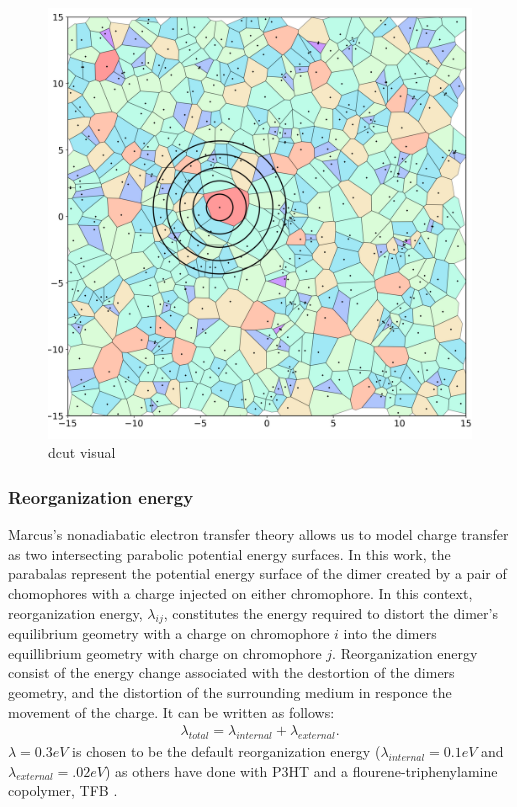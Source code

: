 \begin{figure}
  \center
  \includegraphics[width=0.8\linewidth]{figures/crystalline_voronoi_d_cut_circles.png} 
  \caption{dcut visual}
  \label{fig:dcut}
\end{figure}


\subsubsection{Reorganization energy}
Marcus's nonadiabatic electron transfer theory allows us to model charge transfer as two
intersecting parabolic potential energy surfaces. In this work, the parabalas represent the potential energy surface
of the dimer created by a pair of chomophores with a charge injected on either chromophore. In this context, 
reorganization energy, $\lambda_{ij}$, constitutes the energy required to distort the dimer's equilibrium geometry with a
charge on chromophore $i$ into the dimers equillibrium geometry with charge on chromophore $j$.
Reorganization energy consist of the energy change associated with the destortion of the dimers geometry,
and the distortion of the surrounding medium in responce the movement of the charge. It can be written as
follows:
\begin{align}
    \lambda_{total} = \lambda_{internal} + \lambda_{external}.
\end{align} 
$\lambda = 0.3eV$ is chosen to be the default reorganization energy ($\lambda_{internal} = 0.1eV$
and $\lambda_{external} = .02eV$) as others have done with P3HT \cite{jones2017} and
a flourene-triphenylamine copolymer, TFB \cite{Gali2017}. 

